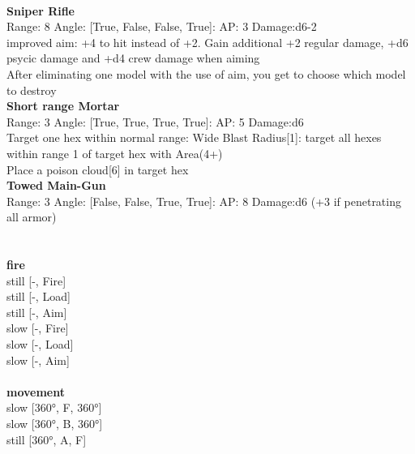 \ \\
{\bf Sniper Rifle } \\



Range: 8  Angle: [True, False, False, True]: AP: 3 Damage:d6-2 \\
improved aim: +4 to hit instead of +2. Gain additional +2 regular damage, +d6 psycic damage and +d4 crew damage when aiming\\ 
After eliminating one model with the use of aim, you get to choose which model to destroy\\ 




{\bf Short range Mortar } \\



Range: 3  Angle: [True, True, True, True]: AP: 5 Damage:d6 \\
Target one hex within normal range: Wide Blast Radius[1]: target all hexes within range 1 of target hex with Area(4+)\\ 
Place a poison cloud[6] in target hex\\ 




{\bf Towed Main-Gun } \\



Range: 3  Angle: [False, False, True, True]: AP: 8 Damage:d6 (+3 if penetrating all armor) \\




 
\ \\



\ \\ {\bf fire } \\
still [-, Fire] \\
still [-, Load] \\
still [-, Aim] \\
slow [-, Fire] \\
slow [-, Load] \\
slow [-, Aim] \\
\ \\ {\bf movement } \\
slow [360°, F, 360°] \\
slow [360°, B, 360°] \\
still [360°, A, F] \\


